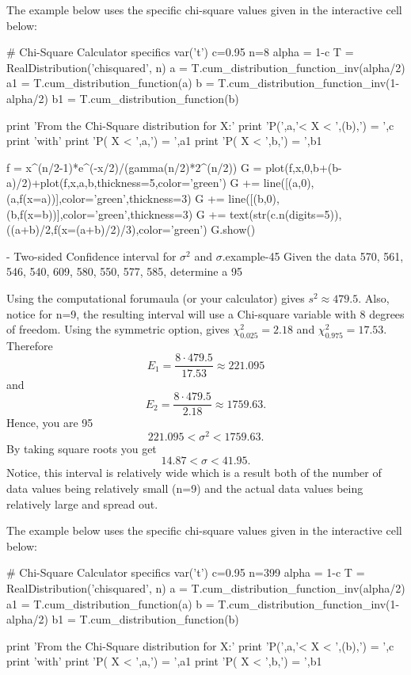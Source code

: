 \documentclass[10pt,]{book}
\numberwithin{equation}{section}
\newcommand{\lt}{<}
\begin{document}
The example below uses the specific chi-square values given in the interactive cell below: \leavevmode%
\begin{sageinput}
# Chi-Square Calculator specifics
var('t')
c=0.95
n=8
alpha = 1-c
T = RealDistribution('chisquared', n)
a = T.cum_distribution_function_inv(alpha/2)
a1 = T.cum_distribution_function(a)
b = T.cum_distribution_function_inv(1-alpha/2)
b1 = T.cum_distribution_function(b)

print 'From the Chi-Square distribution for X:'
print 'P(',a,'< X < ',(b),') = ',c
print 'with'
print 'P( X < ',a,') = ',a1
print 'P( X < ',b,') = ',b1

f = x^(n/2-1)*e^(-x/2)/(gamma(n/2)*2^(n/2))
G = plot(f,x,0,b+(b-a)/2)+plot(f,x,a,b,thickness=5,color='green')
G += line([(a,0),(a,f(x=a))],color='green',thickness=3)
G += line([(b,0),(b,f(x=b))],color='green',thickness=3)
G += text(str(c.n(digits=5)),((a+b)/2,f(x=(a+b)/2)/3),color='green')
G.show()
\end{sageinput}
 \begin{example}{- Two-sided Confidence interval for \(\sigma^2\) and \(\sigma\).}{example-45}%
\hypertarget{p-1142}{}%
Given the data 570, 561, 546, 540, 609, 580, 550, 577, 585, determine a 95%
\par
\hypertarget{p-1143}{}%
Using the computational forumaula (or your calculator) gives \(s^2 \approx 479.5\). Also, notice for n=9, the resulting interval will use a Chi-square variable with 8 degrees of freedom. Using the symmetric option, gives \(\chi_{0.025}^2 = 2.18\) and \(\chi_{0.975}^2 = 17.53\).  Therefore%
\begin{equation*}
E_1 = \frac{8 \cdot 479.5}{17.53} \approx 221.095
\end{equation*}
and%
\begin{equation*}
E_2 = \frac{8 \cdot 479.5}{2.18} \approx 1759.63.
\end{equation*}
Hence, you are 95%
\begin{equation*}
221.095 \lt \sigma^2 \lt 1759.63.
\end{equation*}
By taking square roots you get%
\begin{equation*}
14.87 \lt \sigma \lt 41.95.
\end{equation*}
Notice, this interval is relatively wide which is a result both of the number of data values being relatively small (n=9) and the actual data values being relatively large and spread out.%
\end{example}
 The example below uses the specific chi-square values given in the interactive cell below: \begin{sageinput}
# Chi-Square Calculator specifics
var('t')
c=0.95
n=399
alpha = 1-c
T = RealDistribution('chisquared', n)
a = T.cum_distribution_function_inv(alpha/2)
a1 = T.cum_distribution_function(a)
b = T.cum_distribution_function_inv(1-alpha/2)
b1 = T.cum_distribution_function(b)

print 'From the Chi-Square distribution for X:'
print 'P(',a,'< X < ',(b),') = ',c
print 'with'
print 'P( X < ',a,') = ',a1
print 'P( X < ',b,') = ',b1
\end{sageinput}
\end{document}
